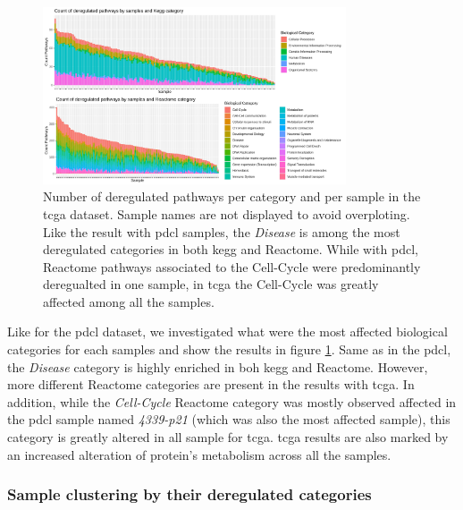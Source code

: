 \begin{figure}
    \begin{center}
        \includegraphics[width=0.8\textwidth]{img/barplot-categ-tcga}
        \caption{
            Number of deregulated pathways per category and per sample in the \acrshort{tcga} dataset.
            Sample names are not displayed to avoid overploting.
            Like the result with \acrshort{pdcl} samples, the \textit{Disease} is among the most deregulated categories in both \acrshort{kegg} and Reactome.
            While with \acrshort{pdcl}, Reactome pathways associated to the Cell-Cycle were predominantly deregualted in one sample, in \acrshort{tcga} the Cell-Cycle was greatly affected among all the samples.
        }
        \label{fig:barplot-categ-tcga}
    \end{center}
\end{figure}

Like for the \acrshort{pdcl} dataset, we investigated what were the most affected biological categories for each samples and show the results in figure \ref*{fig:barplot-categ-tcga}.
Same as in the \acrshort{pdcl}, the \textit{Disease} category is highly enriched in boh \acrshort{kegg} and Reactome.
However, more different Reactome categories are present in the results with \acrshort{tcga}.
In addition, while the \textit{Cell-Cycle} Reactome category was mostly observed affected in the \acrshort{pdcl} sample named \textit{4339-p21} (which was also the most affected sample), this category is greatly altered in all sample for \acrshort{tcga}.
\acrshort{tcga} results are also marked by an increased alteration of protein's metabolism across all the samples.

\subsubsection{Sample clustering by their deregulated categories}


